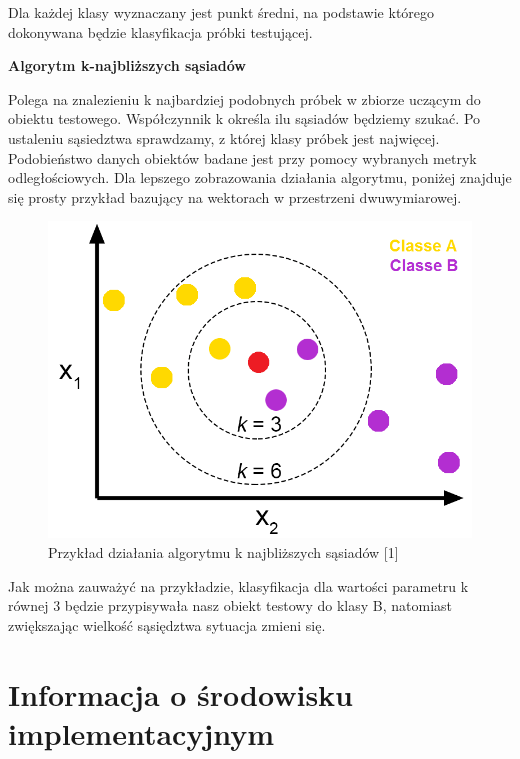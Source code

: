 \documentclass[12pt]{article}
\begin{document}
 
\indent Dla każdej klasy wyznaczany jest punkt średni, na podstawie którego dokonywana będzie klasyfikacja próbki testującej. 
\newline\newline
\centerline{\textbf{Algorytm k-najbliższych sąsiadów}}
\newline
\indent Polega na znalezieniu k najbardziej podobnych próbek w zbiorze uczącym do obiektu testowego. Współczynnik k określa ilu sąsiadów będziemy szukać. Po ustaleniu sąsiedztwa sprawdzamy, z której klasy próbek jest najwięcej. Podobieństwo danych obiektów badane jest przy pomocy wybranych metryk odległościowych. Dla lepszego zobrazowania działania algorytmu, poniżej znajduje się prosty przykład bazujący na wektorach w przestrzeni dwuwymiarowej. \newline
\begin{figure}[H]
	\centering
		\includegraphics[scale=0.6]{images/knn_alg_example.png}
	\caption{Przykład działania algorytmu k najbliższych sąsiadów [1]}
\end{figure}

\indent Jak można zauważyć na przykładzie, klasyfikacja dla wartości parametru k równej 3 będzie przypisywała nasz obiekt testowy do klasy B, natomiast zwiększając wielkość sąsiędztwa sytuacja zmieni się.
\section{Informacja o środowisku implementacyjnym}
\end{document}
